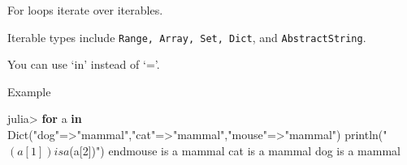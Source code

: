 \documentclass[ignorenonframetext,]{beamer}
\newenvironment{Shaded}{}{}
\newcommand{\KeywordTok}[1]{\textcolor[rgb]{0.00,0.44,0.13}{\textbf{{#1}}}}
\newcommand{\DataTypeTok}[1]{\textcolor[rgb]{0.56,0.13,0.00}{{#1}}}
\newcommand{\StringTok}[1]{\textcolor[rgb]{0.25,0.44,0.63}{{#1}}}
\newcommand{\CommentTok}[1]{\textcolor[rgb]{0.38,0.63,0.69}{\textit{{#1}}}}
\newcommand{\NormalTok}[1]{{#1}}
\begin{document}
\begin{frame}[fragile]{For loops iterate over iterables.}

Iterable types include \texttt{Range,\ Array,\ Set,\ Dict}, and
\texttt{AbstractString}.

\begin{Shaded}
\end{Shaded}

\end{frame}

\begin{frame}[fragile]{You can use `in' instead of `='.}

\begin{Shaded}
\end{Shaded}

\end{frame}

\begin{frame}[fragile]{Example}

\begin{Shaded}
\begin{Highlighting}[]
\NormalTok{julia> }\KeywordTok{for} \NormalTok{a }\KeywordTok{in} \DataTypeTok{Dict}\NormalTok{(}\StringTok{"dog"}\NormalTok{=>}\StringTok{"mammal"}\NormalTok{,}\StringTok{"cat"}\NormalTok{=>}\StringTok{"mammal"}\NormalTok{,}\StringTok{"mouse"}\NormalTok{=>}\StringTok{"mammal"}\NormalTok{)}
    \NormalTok{println(}\StringTok{"$(a[1]) is a $(a[2])"}\NormalTok{)}
\NormalTok{endmouse is a mammal}
\NormalTok{cat is a mammal}
\NormalTok{dog is a mammal}
\end{Highlighting}
\end{Shaded}

\end{frame}
\end{document}
